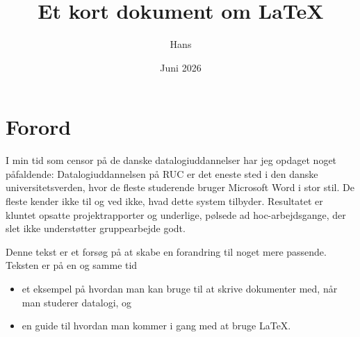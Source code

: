 \documentclass[a4paper,11pt]{report}
\title{Et kort dokument om \LaTeX}
\author{Hans}
\date{Juni 2026}
\begin{document}
\maketitle

\tableofcontents

\chapter*{Forord}

I min tid som censor på de danske datalogiuddannelser har jeg opdaget
noget påfaldende: Datalogiuddannelsen på RUC er det eneste sted i den
danske universitetsverden, hvor de fleste studerende bruger Microsoft
Word i stor stil. De fleste kender ikke til \latex og ved ikke, hvad
dette system tilbyder. Resultatet er kluntet opsatte projektrapporter
og underlige, pølsede ad hoc-arbejdsgange, der slet ikke understøtter
gruppearbejde godt.

Denne tekst er et forsøg på at skabe en forandring til noget mere
passende. Teksten er på en og samme tid 

\begin{itemize}
\item et eksempel på hvordan man kan bruge \latex til at skrive
  dokumenter med, når man studerer datalogi, og 
  
\item en guide til hvordan man kommer i gang med at bruge \LaTeX.
\end{itemize}











\appendix


\end{document}
